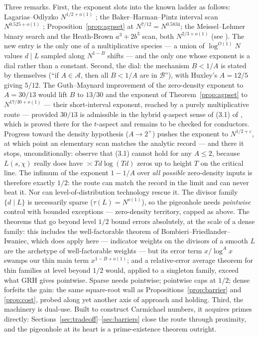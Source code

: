 \documentclass[11pt]{amsart}
\begin{document}
Three remarks. First, the exponent slots into the known ladder as follows:
Lagarias--Odlyzko $N^{1/2+o(1)}$ \cite{LO}; the Baker--Harman--Pintz
interval scan $N^{0.525+o(1)}$ \cite{BHP}; Proposition~\ref{prop:agpset} at
$N^{7/12} = N^{0.5834}$; the Meissel--Lehmer binary search and the
Heath-Brown $a^3 + 2b^3$ scan, both $N^{2/3+o(1)}$ (see \cite{Pol}). The new
entry is the only one of a multiplicative species --- a union of
$\log^{O(1)} N$ values $d \mid L$ sampled along $N^{1-B}$ shifts --- and the
only one whose exponent is a dial rather than a constant. Second, the dial:
the mechanism $B < 1/A$ is stated by \cite{AGP} themselves (``if
$A \in \mathcal{A}$, then all $B < 1/A$ are in $\mathcal{B}$''), with
Huxley's $A = 12/5$ giving $5/12$. The Guth--Maynard improvement of the
zero-density exponent to $A = 30/13$ would lift $B$ to $13/30$ and the
exponent of Theorem~\ref{prop:agpset} to $N^{17/30+o(1)}$ --- their
short-interval exponent, reached by a purely multiplicative route ---
provided $30/13$ is admissible in the hybrid $q$-aspect sense of
\textup{(3.1)} of \cite{AGP}, which is proved there for the $t$-aspect and
remains to be checked for conductors. Progress toward the density
hypothesis ($A \to 2^{+}$) pushes the exponent to $N^{1/2+\varepsilon}$, at
which point an elementary scan matches the analytic record --- and there it
stops, unconditionally: \cite{AGP} observe that \textup{(3.1)} cannot hold
for any $A \le 2$, because $L(s,\chi)$ really does have $\asymp Td\log(Td)$
zeros up to height $T$ on the critical line. The infimum of the exponent
$1 - 1/A$ over \emph{all possible} zero-density inputs is therefore exactly
$1/2$: the route can match the record in the limit and can never beat it.
Nor can level-of-distribution technology rescue it. The divisor family
$\{d \mid L\}$ is necessarily sparse ($\tau(L) = N^{o(1)}$), so the
pigeonhole needs \emph{pointwise} control with bounded exceptions ---
zero-density territory, capped as above. The theorems that go beyond level
$1/2$ bound errors absolutely, at the scale of a dense family: this
includes the well-factorable theorem of Bombieri--Friedlander--%
Iwaniec, which does apply here --- indicator weights on the divisors
of a smooth $L$ are the archetype of well-factorable weights --- but its
error term $x/\log^A x$ swamps our thin main term $x^{1-B+o(1)}$; and a
relative-error average theorem for thin families at level beyond $1/2$
would, applied to a singleton family, exceed what GRH gives pointwise.
Sparse needs pointwise; pointwise caps at $1/2$; dense forfeits the gain:
the same square-root wall as Propositions~\ref{prop:barrier} and
\ref{prop:cost}, probed along yet another axis of approach and holding.
Third, the machinery is dual-use. Built to construct Carmichael numbers, it
acquires primes directly: Sections~\ref{sec:tradeoff}--\ref{sec:barriers}
close the route through proximity, and the pigeonhole at its heart is a
prime-existence theorem outright.
\end{document}
